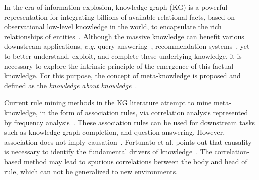 
In the era of information explosion, knowledge graph (KG) is a powerful representation for integrating billions of available relational facts, based on observational low-level knowledge in the world, to encapsulate the rich relationships of entities~\cite{ji2021survey, zhang2020aser}.
Although the massive knowledge can benefit various downstream applications, {\it e.g.} query answering~\cite{wang2021benchmarking,lin2021multi,chen2022fuzzy}, recommendation systems~\cite{wang2019kgat,wang2019multi,li2021kg4vis}, yet to better understand, exploit, and complete these underlying knowledge, it is necessary to explore the intrinsic principle of the emergence of this factual knowledge.
For this purpose,
the concept of meta-knowledge is proposed and defined as the \textit{knowledge about knowledge}~\cite{evans2011metaknowledge}.


Current rule mining methods in the KG literature attempt to mine meta-knowledge, in the form of association rules, via correlation analysis represented by frequency analysis~\cite{galarraga2013amie,galarraga2015fast,meilicke2019anytime}.
These association rules can be used for downstream tasks such as knowledge graph completion, and question answering.
However, association does not imply causation~\cite{10.1214/ss/1177009870}.
Fortunato et al. points out that causality is necessary to identify the fundamental drivers of knowledge~\cite{fortunato2018science}.
The correlation-based method may lead to spurious correlations between the body and head of rule, which can not be generalized to new environments.

